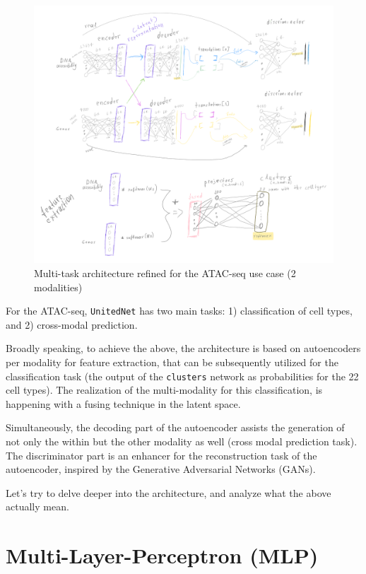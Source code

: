 \documentclass[12pt, a4paper]{article}
\begin{document}
\begin{figure}[h!]
  \centering
  \includegraphics[width=\textwidth]{architecture.png}
  \caption{Multi-task architecture refined for the ATAC-seq use case (2 modalities)}
  \label{fig:architecture}
\end{figure}

For the ATAC-seq, \verb|UnitedNet| has two main tasks: 1) classification of cell types, and 2) cross-modal prediction.

Broadly speaking, to achieve the above, the architecture is based on autoencoders per modality for feature extraction, that can be subsequently utilized for the classification task (the output of the \verb|clusters| network as probabilities for the 22 cell types). The realization of the multi-modality for this classification, is happening with a fusing technique in the latent space. 

Simultaneously, the decoding part of the autoencoder assists the generation of not only the within but the other modality as well (cross modal prediction task). The discriminator part is an enhancer for the reconstruction task of the autoencoder, inspired by the Generative Adversarial Networks (GANs). 


Let's try to delve deeper into the architecture, and analyze what the above actually mean.

\clearpage


\section{Multi-Layer-Perceptron (MLP)}
\label{sec:mlp}
\end{document}
